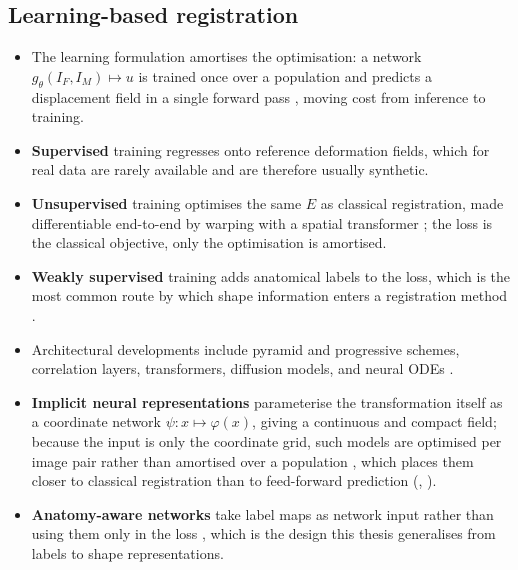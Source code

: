 \subsection{Learning-based registration}
\begin{itemize}
\item The learning formulation amortises the optimisation: a network $g_\theta(I_F, I_M) \mapsto u$ is trained once over a population and predicts a displacement field in a single forward pass \citep{balakrishnan2019voxelmorph}, moving cost from inference to training.
\item \textbf{Supervised} training regresses onto reference deformation fields, which for real data are rarely available and are therefore usually synthetic.
\item \textbf{Unsupervised} training optimises the same $E$ as classical registration, made differentiable end-to-end by warping with a spatial transformer \citep{jaderberg2015spatial}; the loss is the classical objective, only the optimisation is amortised.
\item \textbf{Weakly supervised} training adds anatomical labels to the loss, which is the most common route by which shape information enters a registration method \citep{chen2025survey}.
\item Architectural developments include pyramid and progressive schemes, correlation layers, transformers, diffusion models, and neural ODEs \citep{chen2025survey}.
\item \textbf{Implicit neural representations} parameterise the transformation itself as a coordinate network $\psi : x \mapsto \varphi(x)$, giving a continuous and compact field; because the input is only the coordinate grid, such models are optimised per image pair rather than amortised over a population \citep{chen2025survey}, which places them closer to classical registration than to feed-forward prediction (, ).
\item \textbf{Anatomy-aware networks} take label maps as network input rather than using them only in the loss \citep{chen2025survey}, which is the design this thesis generalises from labels to shape representations.
\end{itemize}

